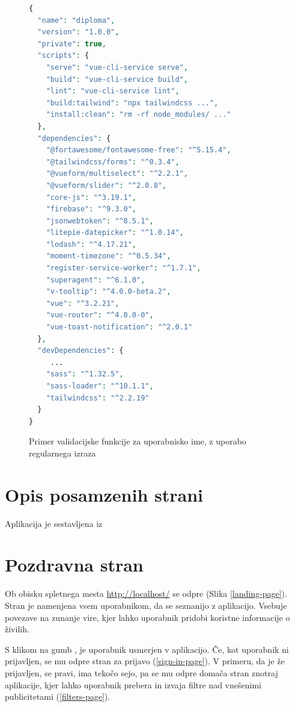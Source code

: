 \documentclass[a4paper, 12pt]{book}
\begin{document}
\begin{figure}
\centering
\begin{lstlisting}[language=php, style=mystyle,caption={Dockerfile datoteka za razvijanje Vue aplikacije},label=lst:pkg-snippet]
{
  "name": "diploma",
  "version": "1.0.0",
  "private": true,
  "scripts": {
    "serve": "vue-cli-service serve",
    "build": "vue-cli-service build",
    "lint": "vue-cli-service lint",
    "build:tailwind": "npx tailwindcss ...",
    "install:clean": "rm -rf node_modules/ ..."
  },
  "dependencies": {
    "@fortawesome/fontawesome-free": "^5.15.4",
    "@tailwindcss/forms": "^0.3.4",
    "@vueform/multiselect": "^2.2.1",
    "@vueform/slider": "^2.0.8",
    "core-js": "^3.19.1",
    "firebase": "^9.3.0",
    "jsonwebtoken": "^8.5.1",
    "litepie-datepicker": "^1.0.14",
    "lodash": "^4.17.21",
    "moment-timezone": "^0.5.34",
    "register-service-worker": "^1.7.1",
    "superagent": "^6.1.0",
    "v-tooltip": "^4.0.0-beta.2",
    "vue": "^3.2.21",
    "vue-router": "^4.0.0-0",
    "vue-toast-notification": "^2.0.1"
  },
  "devDependencies": {
     ...
    "sass": "^1.32.5",
    "sass-loader": "^10.1.1",
    "tailwindcss": "^2.2.19"
  }
}

\end{lstlisting}
\caption{Primer validacijske funkcije za uporabnisko ime, z uporabo regularnega izraza}
\end{figure}


\section{Opis posamzenih strani}

Aplikacija je sestavljena iz 


\section{Pozdravna stran}
Ob obisku spletnega mesta \url{http://localhost/} se odpre  (Slika \ref{landing-page}). Stran je namenjena vsem uporabnikom, da se seznanijo z aplikacijo. Vsebuje povezave na zunanje vire, kjer lahko uporabnik pridobi koristne informacije o živilih. 

S klikom na gumb , je uporabnik usmerjen v aplikacijo. Če, kot uporabnik ni prijavljen, se mu odpre stran za prijavo (\ref{sign-in-page}). V primeru, da je že prijavljen, se pravi, ima tekočo sejo, pa se mu odpre domača stran znotraj aplikacije, kjer lahko uporabnik prebera in izvaja filtre nad vnešenimi publicitetami (\ref{filters-page}).
\end{document}
